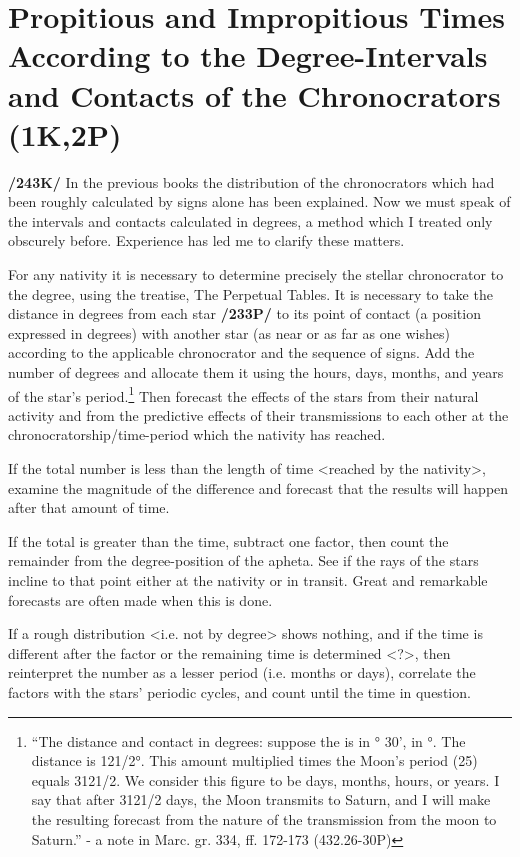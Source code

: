 \section{Propitious and Impropitious Times According to the Degree-Intervals and Contacts of the Chronocrators (1K,2P)}

\textbf{/243K/} In the previous books the distribution of the chronocrators which had been roughly calculated by signs alone has been explained. Now we must speak of the intervals and contacts calculated in degrees, a method which I treated only obscurely before. Experience has led me to clarify these matters.

For any nativity it is necessary to determine precisely the stellar chronocrator to the degree, using the treatise, The Perpetual Tables. It is necessary to take the distance in degrees from each star \textbf{/233P/} to its point of contact (a position expressed in degrees) with another star (as near or as far as one wishes) according to the applicable chronocrator and the sequence of signs. Add the number of degrees and allocate them it using the hours, days, months, and years of the star’s period.\footnote{“The distance and contact in degrees: suppose the \Moon\xspace is in \Virgo\xspace 21° 30', \Saturn\xspace in °. The distance is 121/2°. This amount multiplied times the Moon’s period (25) equals 3121/2. We consider this figure to be days, months, hours, or years. I say that after 3121/2 days, the Moon transmits to Saturn, and I will make the resulting forecast from the nature of the transmission from the moon to Saturn.” - a note
in Marc. gr. 334, ff. 172-173 (432.26-30P)} Then forecast the effects of the stars from their natural activity and from the predictive effects of their transmissions to each other at the chronocratorship/time-period which the nativity has reached. 

If the total number is less than the length of time <reached by the nativity>, examine the magnitude of the difference and forecast that the results will happen after that amount of time. 

If the total is greater than the time, subtract one factor, then count the remainder from the degree-position of the apheta. See if the rays of the stars incline to that point either at the nativity or in transit. Great and remarkable forecasts are often made when this is done. 

If a rough distribution <i.e. not by degree> shows nothing, and if the time is different after the factor or the remaining time is determined <?>, then reinterpret the number as a lesser period (i.e. months or days), correlate the factors with the stars’ periodic cycles, and count until the time in question.

